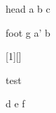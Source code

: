 \documentclass{lyluatexexample}
\begin{document}
\begin{lysavefrag}{head}
a b c
\end{lysavefrag}

\begin{lysavefrag}{foot}
g a' b
\end{lysavefrag}
  
[1][]{%
  {\centering test \par}
  \begin{ly}[
    include_before_body={head,head},
    include_after_body=foot,
  ]
}{
  \end{ly}
}

\begin{yourly}
d e f
\end{yourly}
\end{document}
